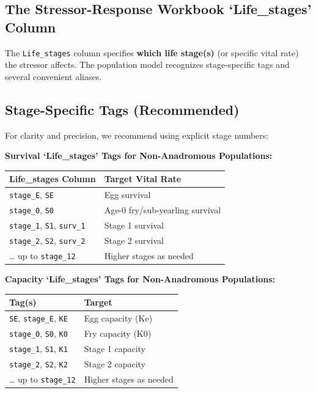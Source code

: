 \documentclass[
  letterpaper,
  DIV=11,
  numbers=noendperiod]{scrreprt}
\begin{document}
\subsection{The Stressor-Response Workbook `Life\_stages'
Column}\label{the-stressor-response-workbook-life_stages-column}

The \texttt{Life\_stages} column specifies \textbf{which life stage(s)}
(or specific vital rate) the stressor affects. The population model
recognizes stage-specific tags and several convenient aliases.

\subsection{Stage-Specific Tags
(Recommended)}\label{stage-specific-tags-recommended}

For clarity and precision, we recommend using explicit stage numbers:

\textbf{Survival `Life\_stages' Tags for Non-Anadromous Populations:}

\begin{longtable}[]{@{}ll@{}}
\toprule\noalign{}
Life\_stages Column & Target Vital Rate \\
\midrule\noalign{}
\endhead
\bottomrule\noalign{}
\endlastfoot
\texttt{stage\_E}, \texttt{SE} & Egg survival \\
\texttt{stage\_0}, \texttt{S0} & Age-0 fry/sub-yearling survival \\
\texttt{stage\_1}, \texttt{S1}, \texttt{surv\_1} & Stage 1 survival \\
\texttt{stage\_2}, \texttt{S2}, \texttt{surv\_2} & Stage 2 survival \\
\ldots{} up to \texttt{stage\_12} & Higher stages as needed \\
\end{longtable}

\textbf{Capacity `Life\_stages' Tags for Non-Anadromous Populations:}

\begin{longtable}[]{@{}ll@{}}
\toprule\noalign{}
Tag(s) & Target \\
\midrule\noalign{}
\endhead
\bottomrule\noalign{}
\endlastfoot
\texttt{SE}, \texttt{stage\_E}, \texttt{KE} & Egg capacity (Ke) \\
\texttt{stage\_0}, \texttt{S0}, \texttt{K0} & Fry capacity (K0) \\
\texttt{stage\_1}, \texttt{S1}, \texttt{K1} & Stage 1 capacity \\
\texttt{stage\_2}, \texttt{S2}, \texttt{K2} & Stage 2 capacity \\
\ldots{} up to \texttt{stage\_12} & Higher stages as needed \\
\end{longtable}
\end{document}
